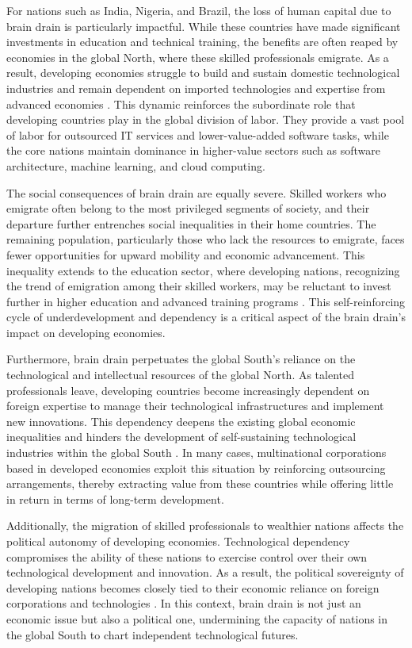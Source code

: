\begin{refsection}
For nations such as India, Nigeria, and Brazil, the loss of human capital due to brain drain is particularly impactful. While these countries have made significant investments in education and technical training, the benefits are often reaped by economies in the global North, where these skilled professionals emigrate. As a result, developing economies struggle to build and sustain domestic technological industries and remain dependent on imported technologies and expertise from advanced economies \cite[pp.~155-157]{adepoju2010}. This dynamic reinforces the subordinate role that developing countries play in the global division of labor. They provide a vast pool of labor for outsourced IT services and lower-value-added software tasks, while the core nations maintain dominance in higher-value sectors such as software architecture, machine learning, and cloud computing.

The social consequences of brain drain are equally severe. Skilled workers who emigrate often belong to the most privileged segments of society, and their departure further entrenches social inequalities in their home countries. The remaining population, particularly those who lack the resources to emigrate, faces fewer opportunities for upward mobility and economic advancement. This inequality extends to the education sector, where developing nations, recognizing the trend of emigration among their skilled workers, may be reluctant to invest further in higher education and advanced training programs \cite[pp.~103-105]{docquier2012}. This self-reinforcing cycle of underdevelopment and dependency is a critical aspect of the brain drain's impact on developing economies.

Furthermore, brain drain perpetuates the global South's reliance on the technological and intellectual resources of the global North. As talented professionals leave, developing countries become increasingly dependent on foreign expertise to manage their technological infrastructures and implement new innovations. This dependency deepens the existing global economic inequalities and hinders the development of self-sustaining technological industries within the global South \cite[pp.~131-133]{carrington1999}. In many cases, multinational corporations based in developed economies exploit this situation by reinforcing outsourcing arrangements, thereby extracting value from these countries while offering little in return in terms of long-term development.

Additionally, the migration of skilled professionals to wealthier nations affects the political autonomy of developing economies. Technological dependency compromises the ability of these nations to exercise control over their own technological development and innovation. As a result, the political sovereignty of developing nations becomes closely tied to their economic reliance on foreign corporations and technologies \cite[pp.~62-65]{faini2006}. In this context, brain drain is not just an economic issue but also a political one, undermining the capacity of nations in the global South to chart independent technological futures.


\end{refsection}
